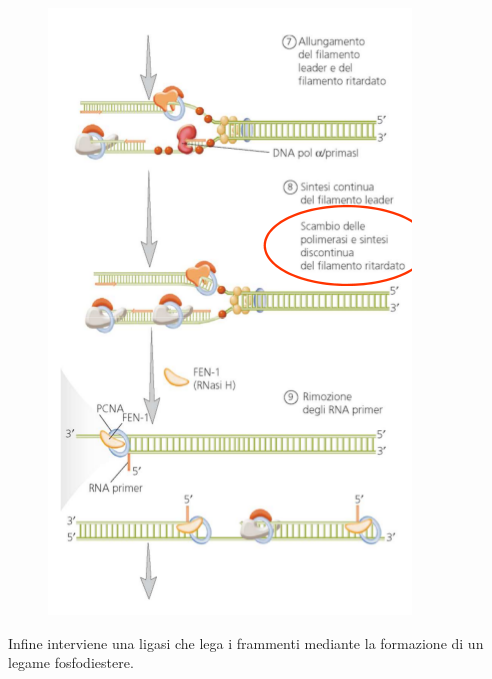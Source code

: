 \documentclass[11pt]{book}
\begin{document}
\begin{figure}[htp]
\centering
\includegraphics[scale=0.7]{img/18_FEN1.png}
\caption{}
\label{fen1}
\end{figure}

\clearpage
Infine interviene una ligasi che lega i frammenti mediante la formazione
di un legame fosfodiestere.
\end{document}
